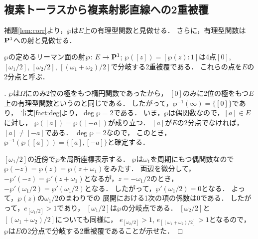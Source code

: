 \subsection{複素トーラスから複素射影直線への2重被覆}
補題\ref{lem:corr}より，$\wp$は$E$上の有理型関数と見做せる．
さらに，有理型関数は$\mathbf{P}^1$への射と見做せる．
\begin{Theorem}
    $\wp$の定めるリーマン面の射$\wp\colon E\to\mathbf{P}^1$; 
    $\wp([z])=[\wp(z):1]$は4点$[0]$, 
    $[\omega_1/2]$, $[\omega_2/2]$, 
    $[(\omega_1+\omega_2)/2]$で分岐する2重被覆である．
    これらの点を$E$の2分点と呼ぶ．
\end{Theorem}
\begin{proof}[\pfb]
    $\wp$は$\Omega$にのみ2位の極をもつ楕円関数であったから，
    $[0]$のみに2位の極をもつ$E$上の有理型関数というのと同じである．
    したがって，$\wp^{-1}(\infty)=\{[0]\}$であり，
    事実\ref{fact:deg}より，$\deg\wp=2$である．
    いま，$\wp$は偶関数なので，$[a]\in E$に対し，
    $\wp([a])=\wp([-a])$が成り立つ．
    $[a]$が$E$の2分点でなければ，$[a]\neq[-a]$である．
    $\deg\wp=2$なので，
    このとき，$\wp^{-1}(\wp([a]))=\{[a],[-a]\}$と確定する．

    $[\omega_1/2]$の近傍で$\wp$を局所座標表示する．
    $\wp$は$\omega_1$を周期にもつ偶関数なので
    $\wp(-z)=\wp(z)=\wp(z+\omega_1)$をみたす．
    両辺を微分して，
    $-\wp'(-z)=\wp'(z+\omega_1)$となるが，$z=-\omega_1/2$のとき，
    $-\wp'(\omega_1/2)=\wp'(\omega_1/2)$となる．
    したがって，$\wp'(\omega_1/2)=0$となる．
    よって，$\wp(z)$の$\omega_1/2$のまわりでの
    展開における1次の項の係数は0である．
    したがって，$e_{[\omega_1/2]}>1$であり，
    $[\omega_1/2]$は$\wp$の分岐点である．
    $[\omega_2/2]$と$[(\omega_1+\omega_2)/2]$についても同様に，
    $e_{[\omega_2/2]}>1$, $e_{[(\omega_1+\omega_2)/2]}>1$となるので，
    $\wp$は$E$の2分点で分岐する2重被覆であることが示せた．
\end{proof}
